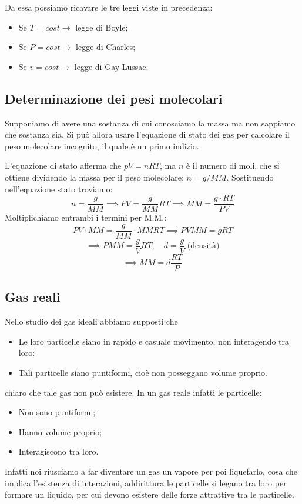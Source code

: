 Da essa possiamo ricavare le tre leggi viste in precedenza:

\begin{itemize}
    \item Se $T=cost \rightarrow$ legge di Boyle;
    \item Se $P=cost \rightarrow$ legge di Charles;
    \item Se $v=cost \rightarrow$ legge di Gay-Lussac.
\end{itemize}
\subsection{Determinazione dei pesi molecolari}
Supponiamo di avere una sostanza di cui conosciamo la massa ma non sappiamo che sostanza sia. Si può allora usare l'equazione di stato dei gas per calcolare il peso molecolare incognito, il quale è un primo indizio.

L'equazione di stato afferma che $pV=nRT$, ma $n$ è il numero di moli, che si ottiene dividendo la massa per il peso molecolare: $n=g/MM$. Sostituendo nell'equazione stato troviamo:
$$n=\frac{g}{MM} \implies PV=\frac{g}{MM}RT \implies MM=\frac{g \cdot RT}{PV}$$
Moltiplichiamo entrambi i termini per M.M.:
$$PV \cdot MM=\frac{g}{MM}\cdot MM RT \implies PV MM = gRT$$
$$ \implies PMM = \frac{g}{V}RT, \quad d=\frac{g}{V} \; \text{(densità)}$$
$$\implies MM = d \frac{RT}{P}$$
\subsection{Gas reali}
Nello studio dei gas ideali abbiamo supposti che

\begin{itemize}
    \item Le loro particelle siano in rapido e casuale movimento, non interagendo tra loro:
    \item Tali particelle siano puntiformi, cioè non posseggano volume proprio.
\end{itemize}

\E chiaro che tale gas non può esistere. In un gas reale infatti le particelle:

\begin{itemize}
    \item Non sono puntiformi;
    \item Hanno volume proprio;
    \item Interagiscono tra loro. 
\end{itemize}

Infatti noi riusciamo a far diventare un gas un vapore per poi liquefarlo, cosa che implica l'esistenza di interazioni, addirittura le particelle si legano tra loro per formare un liquido, per cui devono esistere delle forze attrattive tra le particelle.

